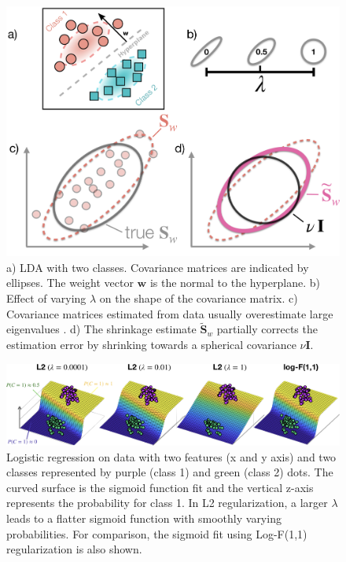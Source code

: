 \documentclass[utf8]{frontiersSCNS} %
\newcommand{\w}{\mathbf{w}}
\renewcommand{\S}{\mathbf{S}}
\begin{document}
\begin{figure}[ht!]
\centering\includegraphics[width=\linewidth]{figures/LDA_regularization}
\caption{a) LDA with two classes. Covariance matrices are indicated by ellipses. The weight vector $\w$ is the normal to the hyperplane. b) Effect of varying $\lambda$ on the shape of the covariance matrix. c) Covariance matrices estimated from data usually overestimate large eigenvalues \citep{Blankertz2011}. d) The shrinkage estimate $\widetilde{\S}_w$ partially corrects the estimation error by shrinking towards a spherical covariance $\nu\mathbf{I}$.}\label{fig:lda}
\end{figure}

\begin{figure}[ht!]
\centering\includegraphics[width=\linewidth]{figures/logreg_regularization}
\caption{Logistic regression on data with two features (x and y axis) and two classes represented by purple (class 1) and green (class 2) dots. The curved surface is the sigmoid function fit and the vertical z-axis represents the probability for class 1. In L2 regularization, a larger $\lambda$ leads to a flatter sigmoid function with smoothly varying probabilities. For comparison, the sigmoid fit using Log-F(1,1) regularization is also shown.}\label{fig:logreg}
\end{figure}

\end{document}
